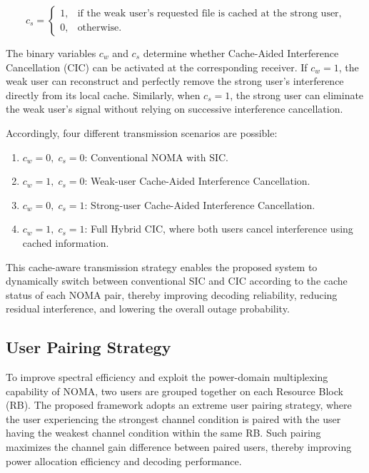 \documentclass[conference]{IEEEtran}
\begin{document}
\begin{equation}
c_s=
\begin{cases}
1,& \text{if the weak user's requested file is cached at the strong user},\\
0,& \text{otherwise}.
\end{cases}
\end{equation}

The binary variables $c_w$ and $c_s$ determine whether Cache-Aided Interference Cancellation (CIC) can be activated at the corresponding receiver. If $c_w=1$, the weak user can reconstruct and perfectly remove the strong user's interference directly from its local cache. Similarly, when $c_s=1$, the strong user can eliminate the weak user's signal without relying on successive interference cancellation.

Accordingly, four different transmission scenarios are possible:

\begin{enumerate}
\item $c_w=0,\;c_s=0$: Conventional NOMA with SIC.
\item $c_w=1,\;c_s=0$: Weak-user Cache-Aided Interference Cancellation.
\item $c_w=0,\;c_s=1$: Strong-user Cache-Aided Interference Cancellation.
\item $c_w=1,\;c_s=1$: Full Hybrid CIC, where both users cancel interference using cached information.
\end{enumerate}

This cache-aware transmission strategy enables the proposed system to dynamically switch between conventional SIC and CIC according to the cache status of each NOMA pair, thereby improving decoding reliability, reducing residual interference, and lowering the overall outage probability.

\subsection{User Pairing Strategy}

To improve spectral efficiency and exploit the power-domain multiplexing capability of NOMA, two users are grouped together on each Resource Block (RB). The proposed framework adopts an extreme user pairing strategy, where the user experiencing the strongest channel condition is paired with the user having the weakest channel condition within the same RB. Such pairing maximizes the channel gain difference between paired users, thereby improving power allocation efficiency and decoding performance.
\end{document}
